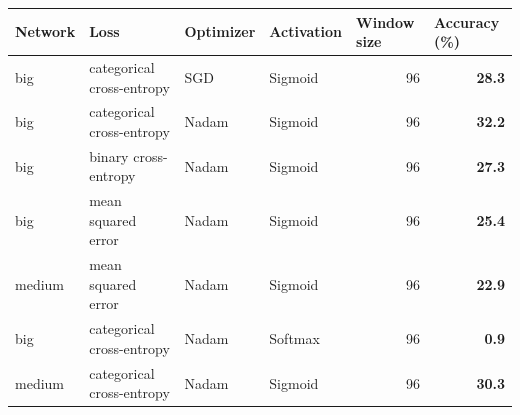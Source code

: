 \documentclass[11pt, twocolumn]{article}
\begin{document}
\begin{table}[]
    \centering
    \begin{tabular}{@{}llllrr@{}}
        \toprule
        \textbf{Network}               & \textbf{Loss}                               & \textbf{Optimizer}            & \textbf{Activation}             & \multicolumn{1}{l}{\textbf{Window size}}                                & \multicolumn{1}{l}{\textbf{Accuracy (\%)}} \\ \midrule
        big                            & categorical cross-entropy                    & SGD                           & Sigmoid                         & \multicolumn{1}{r|}{96}                                                 & \textbf{28.3}                              \\
        big                            & categorical cross-entropy                    & \cellcolor[HTML]{9AFF99}Nadam & Sigmoid                         & \multicolumn{1}{r|}{96}                                                 & \textbf{32.2}                              \\
        big                            & \cellcolor[HTML]{FFCCC9}binary cross-entropy & Nadam                         & Sigmoid                         & \multicolumn{1}{r|}{96}                                                 & \textbf{27.3}                              \\
        big                            & \cellcolor[HTML]{FFCCC9}mean squared error  & Nadam                         & Sigmoid                         & \multicolumn{1}{r|}{96}                                                 & \textbf{25.4}                              \\
        \cellcolor[HTML]{FFCCC9}medium & mean squared error                          & Nadam                         & Sigmoid                         & \multicolumn{1}{r|}{96}                                                 & \textbf{22.9}                              \\
        big                            & categorical cross-entropy                    & Nadam                         & \cellcolor[HTML]{FFCCC9}Softmax & \multicolumn{1}{r|}{96}                                                 & \textbf{0.9}                               \\
        \cellcolor[HTML]{FFCCC9}medium & categorical cross-entropy                    & Nadam                         & Sigmoid                         & \multicolumn{1}{r|}{96}                                                 & \textbf{30.3}                              \\

\end{tabular}
\end{table}
\end{document}
